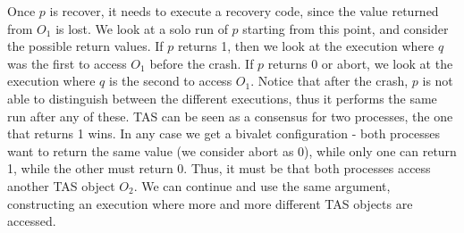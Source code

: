 \documentclass{article}
\begin{document}
Once $p$ is recover, it needs to execute a recovery code, since the value returned from $O_1$ is lost. We look at a solo run of $p$ starting from this point, and consider the possible return values. If $p$ returns 1, then we look at the execution where $q$ was the first to access $O_1$ before the crash. If $p$ returns 0 or abort, we look at the execution where $q$ is the second to access $O_1$. Notice that after the crash, $p$ is not able to distinguish between the different executions, thus it performs the same run after any of these. TAS can be seen as a consensus for two processes, the one that returns 1 wins. In any case we get a bivalet configuration - both processes want to return the same value (we consider abort as 0), while only one can return 1, while the other must return 0. Thus, it must be that both processes access another TAS object $O_2$. We can continue and use the same argument, constructing an execution where more and more different TAS objects are accessed.





\end{document}
